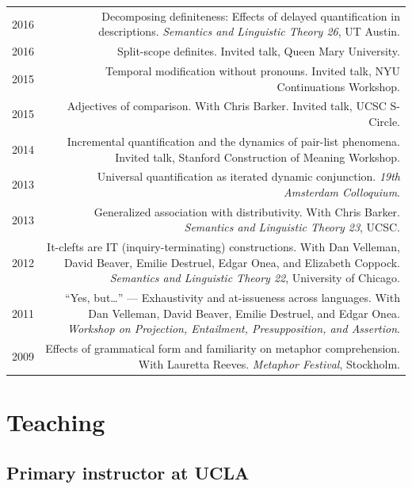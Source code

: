 \documentclass[12pt]{article}
\begin{document}
\begin{longtable}{LR}
  2016 & Decomposing definiteness: Effects of delayed quantification in
         descriptions.
         \textit{Semantics and Linguistic Theory 26}, UT Austin.\\
  2016 & Split-scope definites.
         Invited talk, Queen Mary University.\\
  2015 & Temporal modification without pronouns.
         Invited talk, NYU Continuations Workshop.\\
  2015 & Adjectives of comparison.
         With Chris Barker.
         Invited talk, UCSC S-Circle.\\
  2014 & Incremental quantification and the dynamics of pair-list phenomena.
         Invited talk, Stanford Construction of Meaning Workshop.\\
  2013 & Universal quantification as iterated dynamic conjunction.
         \textit{19th Amsterdam Colloquium}. \\
  2013 & Generalized association with distributivity.
         With Chris Barker.
         \textit{Semantics and Linguistic Theory 23}, UCSC.\\
  2012 & It-clefts are IT (inquiry-terminating) constructions.
         With Dan Velleman, David Beaver, Emilie Destruel, Edgar Onea, and
         Elizabeth Coppock.
         \textit{Semantics and Linguistic Theory 22}, University of Chicago.\\
  2011 & ``Yes, but\dots'' --- Exhaustivity and at-issueness across languages.
          With Dan Velleman, David Beaver, Emilie Destruel, and Edgar Onea.
          \textit{Workshop on Projection, Entailment, Presupposition, and
          Assertion}.\\
  2009 & Effects of grammatical form and familiarity on metaphor
         comprehension.
         With Lauretta Reeves.
         \textit{Metaphor Festival}, Stockholm.
\end{longtable}

\medskip

\section*{Teaching}

\subsection*{Primary instructor at UCLA}
\end{document}

